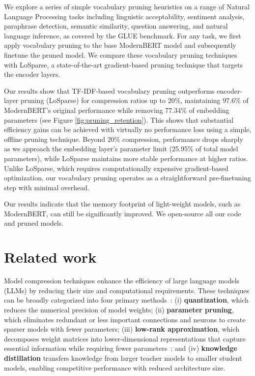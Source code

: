 \documentclass[twocolumn]{article}
\begin{document}
We explore a series of simple vocabulary pruning heuristics on a range of Natural Language Processing tasks including linguistic acceptability, sentiment analysis, paraphrase detection, semantic similarity, question answering, and natural language inference, as covered by the GLUE benchmark. For any task, we first apply vocabulary pruning to the base ModernBERT model and subsequently finetune the pruned model. We compare these vocabulary pruning techniques with LoSparse, a state-of-the-art gradient-based pruning technique that targets the encoder layers.

Our results show that TF-IDF-based vocabulary pruning outperforms encoder-layer pruning (LoSparse) for compression ratios up to 20\%, maintaining 97.6\% of ModernBERT's original performance while removing 77.34\% of embedding parameters (see Figure \ref{fig:pruning_retention}). This shows that substantial efficiency gains can be achieved with virtually no performance loss using a simple, offline pruning technique. Beyond 20\% compression, performance drops sharply as we approach the embedding layer's parameter limit (25.95\% of total model parameters), while LoSparse maintains more stable performance at higher ratios. Unlike LoSparse, which requires computationally expensive gradient-based optimization, our vocabulary pruning operates as a straightforward pre-finetuning step with minimal overhead.

Our results indicate that the memory footprint of light-weight models, such as ModernBERT, can still be significantly improved.  We open-source all our code and pruned models.

\section{Related work}
Model compression techniques enhance the efficiency of large language models (LLMs) by reducing their size and computational requirements.
% 
These techniques can be broadly categorized into four primary methods~\cite{wan2023efficient}:
(i) \textbf{quantization}, which reduces the numerical precision of model weights;
(ii) \textbf{parameter pruning}, which eliminates redundant or less important connections and neurons to create sparser models with fewer parameters;
(iii) \textbf{low-rank approximation}, which decomposes weight matrices into lower-dimensional representations that capture essential information while requiring fewer parameters~\cite{Hu2021LoRA}; and
(iv) \textbf{knowledge distillation} transfers knowledge from larger teacher models to smaller student models, enabling competitive performance with reduced architecture size.~\cite{Hinton2015Distillation}
\end{document}
